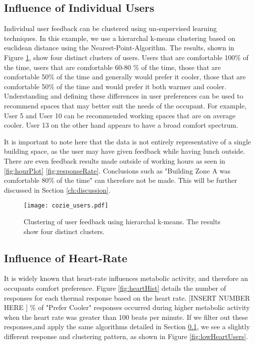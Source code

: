 \subsection{Influence of Individual Users}
\label{ch:userResults}

Individual user feedback can be clustered using un-supervised learning techniques. In this example, we use a hierarchal k-means clustering based on euclidean distance using the Nearest-Point-Algorithm. The results, shown in Figure \ref{fig:userPlot}, show four distinct clusters of users. Users that are comfortable 100\% of the time, users that are comfortable 60-80 \% of the time, those that are comfortable 50\% of the time and generally would prefer it cooler, those that are comfortable 50\% of the time and would prefer it both warmer and cooler. Understanding and defining these differences in user preferences can be used to recommend spaces that may better suit the needs of the occupant. For example, User 5 and User 10 can be recommended working spaces that are on average cooler. User 13 on the other hand appears to have a broad comfort spectrum. 

It is important to note here that the data is not entirely representative of a single building space, as the user may have given feedback while having lunch outside. There are even feedback results made outside of working hours as seen in \ref{fig:hourPlot} \ref{fig:responseRate}. Conclusions such as "Building Zone A was comfortable 80\% of the time" can therefore not be made. This will be further discussed in Section \ref{ch:discussion}.


\begin{figure}
\begin{center}
\texttt{[image: cozie\_users.pdf]}
\caption{Clustering of user feedback using hierarchal k-means. The results show four distinct clusters.}
\label{fig:userPlot}
\end{center}
\end{figure}

\subsection{Influence of Heart-Rate}

It is widely known that heart-rate influences metabolic activity, and therefore an occupants comfort preference. Figure \ref{fig:heartHist} details the number of responses for each thermal response based on the heart rate. [INSERT NUMBER HERE ] \% of "Prefer Cooler" responses occurred during higher metabolic activity when the heart rate was greater than 100 beats per minute. If we filter out these responses,and apply the same algorithms detailed in Section \ref{ch:userResults}, we see a slightly different response and clustering pattern, as shown in Figure \ref{fig:lowHeartUsers}. 

